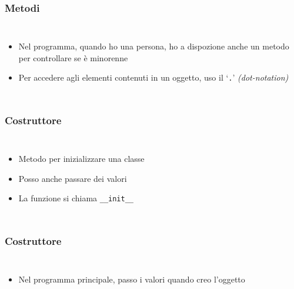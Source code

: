 \begin{contentframe}
    \frametitle{Metodi}

    \begin{columns}
        \begin{itemize}
            \item Nel programma, quando ho una persona, ho a dispozione anche un metodo per controllare se è minorenne

            \bigskip
            \item Per accedere agli elementi contenuti in un oggetto, uso il `\texttt{.}' \textit{(dot-notation)}
        \end{itemize}
        
        \centering
    \end{columns}
\end{contentframe}

\begin{contentframe}
    \frametitle{Costruttore}

    \begin{columns}
        \begin{itemize}
            \item Metodo per inizializzare una classe
            \item Posso anche passare dei valori

            \bigskip
            \item La funzione si chiama \texttt{\_\_init\_\_}
        \end{itemize}
        
        \centering
    \end{columns}
\end{contentframe}

\begin{contentframe}
    \frametitle{Costruttore}

    \begin{columns}
        \begin{itemize}
            \item Nel programma principale, passo i valori quando creo l'oggetto
        \end{itemize}
        
        \centering
    \end{columns}
\end{contentframe}

